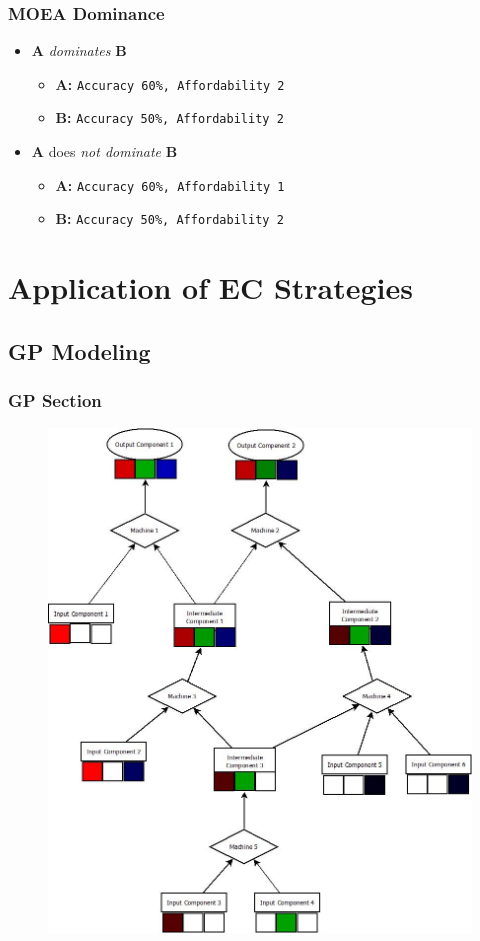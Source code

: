 \documentclass{beamer}
\begin{document}
\begin{frame}[fragile]
\frametitle{MOEA Dominance}
\begin{itemize}
\item \textbf{A} \textit{dominates} \textbf{B}
	\begin{itemize}
	\item \textbf{A:} \verb|Accuracy 60%, Affordability 2|
	\item \textbf{B:} \verb|Accuracy 50%, Affordability 2|\pause
	\end{itemize}
\item \textbf{A} does \textit{not dominate} \textbf{B}
	\begin{itemize}
	\item \textbf{A:} \verb|Accuracy 60%, Affordability 1|
	\item \textbf{B:} \verb|Accuracy 50%, Affordability 2|
	\end{itemize}
\end{itemize}
\end{frame}

\section{Application of EC Strategies}

\subsection{GP Modeling}
\begin{frame}
\frametitle{GP Section}
\begin{figure}
\includegraphics[width=0.5\linewidth]{BaseModel.jpeg}
\end{figure}
\end{frame}
\end{document}

